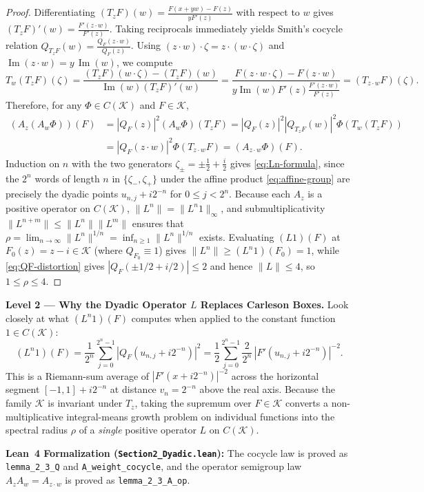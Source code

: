\documentclass[12pt]{article}
\def\K{\mathcal{K}}
\theoremstyle{definition}
\numberwithin{equation}{section}
\begin{document}
\begin{proof}
Differentiating $(T_z F)(w) = \frac{F(x+yw) - F(z)}{y F'(z)}$ with respect to $w$ gives $(T_z F)'(w) = \frac{F'(z \cdot w)}{F'(z)}$. Taking reciprocals immediately yields Smith's cocycle relation $Q_{T_z F}(w) = \frac{Q_F(z \cdot w)}{Q_F(z)}$. Using $(z \cdot w) \cdot \zeta = z \cdot (w \cdot \zeta)$ and $\operatorname{Im}(z \cdot w) = y \, \operatorname{Im}(w)$, we compute
\[
  T_w(T_z F)(\zeta) = \frac{(T_z F)(w \cdot \zeta) - (T_z F)(w)}{\operatorname{Im}(w) (T_z F)'(w)} = \frac{F(z \cdot w \cdot \zeta) - F(z \cdot w)}{y \operatorname{Im}(w) F'(z) \frac{F'(z \cdot w)}{F'(z)}} = (T_{z \cdot w} F)(\zeta).
\]
Therefore, for any $\Phi \in C(\K)$ and $F \in \K$,
\[
\begin{aligned}
  (A_z(A_w \Phi))(F) &= |Q_F(z)|^2 (A_w \Phi)(T_z F) = |Q_F(z)|^2 |Q_{T_z F}(w)|^2 \Phi(T_w(T_z F)) \\
  &= |Q_F(z \cdot w)|^2 \Phi(T_{z \cdot w} F) = (A_{z \cdot w}\Phi)(F).
\end{aligned}
\]
Induction on $n$ with the two generators $\zeta_\pm = \pm \frac{1}{2} + \frac{i}{2}$ gives \eqref{eq:Ln-formula}, since the $2^n$ words of length $n$ in $\{\zeta_-, \zeta_+\}$ under the affine product \eqref{eq:affine-group} are precisely the dyadic points $u_{n, j} + i 2^{-n}$ for $0 \le j < 2^n$. Because each $A_z$ is a positive operator on $C(\K)$, $\|L^n\| = \|L^n 1\|_\infty$, and submultiplicativity $\|L^{n+m}\| \le \|L^n\|\|L^m\|$ ensures that $\rho = \lim_{n\to\infty} \|L^n\|^{1/n} = \inf_{n\ge 1} \|L^n\|^{1/n}$ exists. Evaluating $(L 1)(F)$ at $F_0(z) = z - i \in \K$ (where $Q_{F_0} \equiv 1$) gives $\|L^n\| \ge (L^n 1)(F_0) = 1$, while \eqref{eq:QF-distortion} gives $|Q_F(\pm 1/2 + i/2)| \le 2$ and hence $\|L\| \le 4$, so $1 \le \rho \le 4$.
\end{proof}

\begin{leveltwo}
\noindent\textbf{\textcolor{l2border}{Level 2 --- Why the Dyadic Operator $L$ Replaces Carleson Boxes.}}
Look closely at what $(L^n 1)(F)$ computes when applied to the constant function $1 \in C(\K)$:
\[
  (L^n 1)(F) = \frac{1}{2^n} \sum_{j=0}^{2^n-1} |Q_F(u_{n, j} + i 2^{-n})|^2 = \frac{1}{2} \sum_{j=0}^{2^n-1} \frac{2}{2^n} \, |F'(u_{n, j} + i 2^{-n})|^{-2}.
\]
This is a Riemann-sum average of $|F'(x + i 2^{-n})|^{-2}$ across the horizontal segment $[-1, 1] + i 2^{-n}$ at distance $v_n = 2^{-n}$ above the real axis. Because the family $\K$ is invariant under $T_z$, taking the supremum over $F \in \K$ converts a non-multiplicative integral-means growth problem on individual functions into the spectral radius $\rho$ of a \emph{single} positive operator $L$ on $C(\K)$.

\smallskip
\noindent\textbf{\textcolor{leannote}{Lean~4 Formalization (\texttt{Section2\_Dyadic.lean}):}} The cocycle law is proved as \texttt{lemma\_2\_3\_Q} and \texttt{A\_weight\_cocycle}, and the operator semigroup law $A_z A_w = A_{z\cdot w}$ is proved as \texttt{lemma\_2\_3\_A\_op}.
\end{leveltwo}
\end{document}
